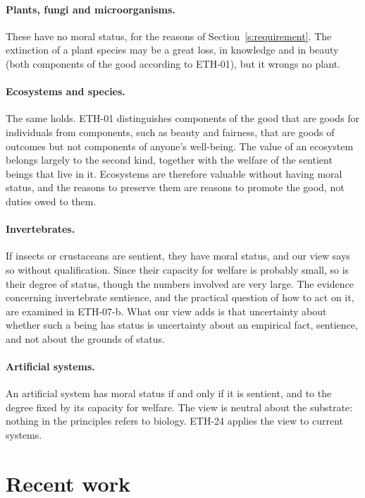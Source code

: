 \documentclass{situationist-preprint}
\begin{document}
\paragraph{Plants, fungi and microorganisms.} These have no moral status, for the reasons of Section~\ref{s:requirement}. The extinction of a plant species may be a great loss, in knowledge and in beauty (both components of the good according to ETH-01), but it wrongs no plant.

\paragraph{Ecosystems and species.} The same holds. ETH-01 distinguishes components of the good that are goods for individuals from components, such as beauty and fairness, that are goods of outcomes but not components of anyone's well-being. The value of an ecosystem belongs largely to the second kind, together with the welfare of the sentient beings that live in it. Ecosystems are therefore valuable without having moral status, and the reasons to preserve them are reasons to promote the good, not duties owed to them.

\paragraph{Invertebrates.} If insects or crustaceans are sentient, they have moral status, and our view says so without qualification. Since their capacity for welfare is probably small, so is their degree of status, though the numbers involved are very large. The evidence concerning invertebrate sentience, and the practical question of how to act on it, are examined in ETH-07-b. What our view adds is that uncertainty about whether such a being has status is uncertainty about an empirical fact, sentience, and not about the grounds of status.

\paragraph{Artificial systems.} An artificial system has moral status if and only if it is sentient, and to the degree fixed by its capacity for welfare. The view is neutral about the substrate: nothing in the principles refers to biology. ETH-24 applies the view to current systems.

\section{Recent work}\label{s:recent}
\end{document}
